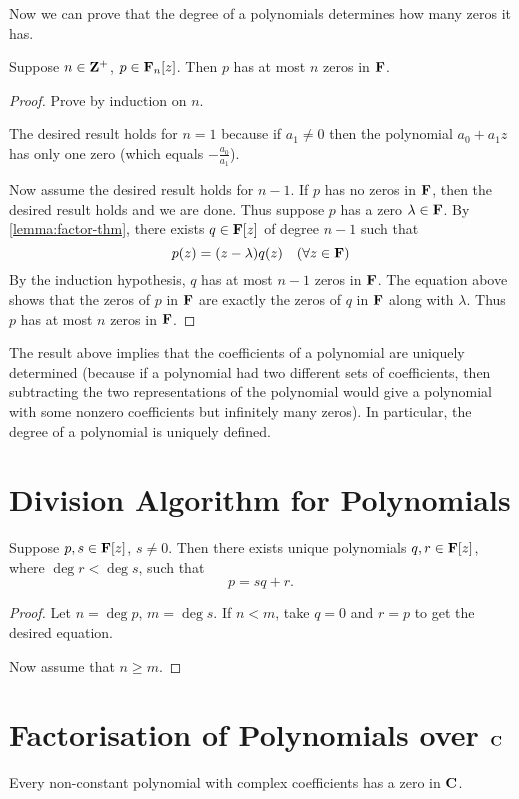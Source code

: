 Now we can prove that the degree of a polynomials determines how many zeros it has.

\begin{proposition}
Suppose $n\in\mathbf Z^+$, $p\in\mathbf F_n[z]$. Then $p$ has at most $n$ zeros in $\mathbf F$.
\end{proposition}

\begin{proof}
Prove by induction on $n$.

The desired result holds for $n=1$ because if $a_1\neq0$ then the polynomial $a_0+a_1z$ has only one zero (which equals $-\frac{a_0}{a_1}$).

Now assume the desired result holds for $n-1$. If $p$ has no zeros in $\mathbf F$, then the desired result holds and we are done. Thus suppose $p$ has a zero $\lambda\in\mathbf F$. By \cref{lemma:factor-thm}, there exists $q\in\mathbf F[z]$ of degree $n-1$ such that
\[p(z)=(z-\lambda)q(z)\quad(\forall z\in\mathbf F)\]
By the induction hypothesis, $q$ has at most $n-1$ zeros in $\mathbf F$. The equation above shows that the zeros of $p$ in $\mathbf F$ are exactly the zeros of $q$ in $\mathbf F$ along with $\lambda$. Thus $p$ has at most $n$ zeros in $\mathbf F$.
\end{proof}

The result above implies that the coefficients of a polynomial are uniquely determined (because if a polynomial had two different sets of coefficients, then subtracting the two representations of the polynomial would give a polynomial with some nonzero coefficients but infinitely many zeros). In particular, the degree of a polynomial is uniquely defined.
\pagebreak

\section{Division Algorithm for Polynomials}
\begin{proposition}
Suppose $p,s\in\mathbf F[z]$, $s\neq0$. Then there exists unique polynomials $q,r\in\mathbf F[z]$, where $\deg r<\deg s$, such that
\[p=sq+r.\]
\end{proposition}

\begin{proof}
Let $n=\deg p$, $m=\deg s$. If $n<m$, take $q=0$ and $r=p$ to get the desired equation.

Now assume that $n\ge m$.
\end{proof}
\pagebreak

\section{Factorisation of Polynomials over $\mathbf C$}
\begin{theorem}
Every non-constant polynomial with complex coefficients has a zero in $\mathbf C$.
\end{theorem}

